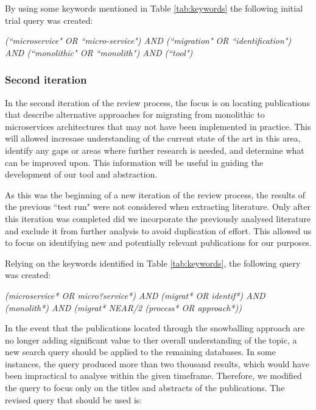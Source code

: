\documentclass[conference]{IEEEtran}
\begin{document}
By using some keywords mentioned in Table \ref{tab:keywords} the following
initial trial query was created:

\begin{center}
  \emph{(``microservice" OR ``micro-service") AND (``migration" OR
  ``identification") AND (``monolithic" OR ``monolith") AND (``tool")}
\end{center}

\subsubsection*{Second iteration} \label{subsub:second-iteration}

In the second iteration of the review process, the focus is on locating
publications that describe alternative approaches for migrating from monolithic
to microservices architectures that may not have been implemented in practice.
This will allowed incresase understanding of the current state of the art in
this area, identify any gaps or areas where further research is needed, and
determine what can be improved upon. This information will be useful in guiding
the development of our tool and abstraction.

As this was the beginning of a new iteration of the review process, the results
of the previous ``test run" were not considered when extracting literature.
Only after this iteration was completed did we incorporate the previously
analysed literature and exclude it from further analysis to avoid duplication
of effort. This allowed us to focus on identifying new and potentially relevant
publications for our purposes.

Relying on the keywords identified in Table \ref{tab:keywords}, the following
query was created:

\begin{center}
  \emph{(microservice* OR micro?service*) AND (migrat* OR identif*) AND
  (monolith*) AND (migrat* NEAR/2 (process* OR approach*))}
\end{center}

In the event that the publications located through the snowballing approach are
no longer adding significant value to ther overall understanding of the topic,
a new search query should be applied to the remaining databases. In some
instances, the query produced more than two thousand results, which would have
been impractical to analyse within the given timeframe. Therefore, we modified
the query to focus only on the titles and abstracts of the publications. The
revised query that should be used is:
\end{document}
